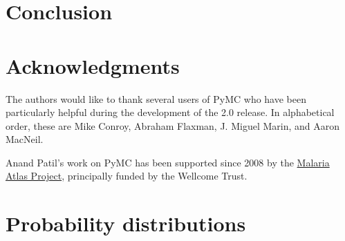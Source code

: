 \documentclass[]{jss_mod}
\begin{document}
\section{Conclusion}
\label{conclusion}


\section[Acknowledgments]{Acknowledgments}
\label{sec:acknowledge}
The authors would like to thank several users of PyMC who have been particularly helpful during the development of the 2.0 release. In alphabetical order, these are Mike Conroy, Abraham Flaxman, J. Miguel Marin, and Aaron MacNeil.

Anand Patil's work on PyMC has been supported since 2008 by the \href{http://www.map.ox.ac.uk}{Malaria Atlas
Project}, principally funded by the Wellcome Trust.

\appendix
% 

\section[Distributions]{Probability distributions}
\label{sec:distributions}


\nocite{Bernardo:1992fk}
\nocite{r} 
\nocite{jags} 
\nocite{winbugs}
\nocite{hbc} 

\end{document}
